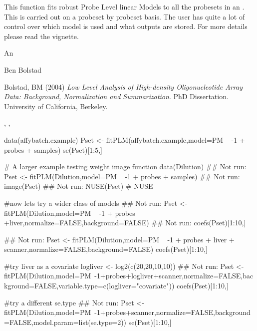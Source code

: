 \begin{Details}\relax
This function fits robust Probe Level linear Models to all the probesets in
an . This is carried out on a probeset by
probeset basis. The user has quite a lot of control over which model
is used and what outputs are stored. For more details please read the vignette.
\end{Details}
\begin{Value}
An 
\end{Value}
\begin{Author}\relax
Ben Bolstad 
\end{Author}
\begin{References}\relax
Bolstad, BM (2004) \emph{Low Level Analysis of High-density
Oligonucleotide Array Data: Background, Normalization and
Summarization}. PhD Dissertation. University of California,
Berkeley.
\end{References}
\begin{SeeAlso}\relax
{},
, 
\end{SeeAlso}
\begin{Examples}
\begin{ExampleCode}
data(affybatch.example)
Pset <- fitPLM(affybatch.example,model=PM ~ -1 + probes + samples)
se(Pset)[1:5,]

# A larger example testing weight image function
data(Dilution)
## Not run: Pset <- fitPLM(Dilution,model=PM ~ -1 + probes + samples)
## Not run: image(Pset)
## Not run: NUSE(Pset) # NUSE

#now lets try a wider class of models
## Not run: Pset <- fitPLM(Dilution,model=PM ~ -1 + probes +liver,normalize=FALSE,background=FALSE)
## Not run: coefs(Pset)[1:10,]

## Not run: Pset <- fitPLM(Dilution,model=PM ~ -1 + probes + liver + scanner,normalize=FALSE,background=FALSE)
coefs(Pset)[1:10,]

#try liver as a covariate
logliver <- log2(c(20,20,10,10))
## Not run: Pset <- fitPLM(Dilution,model=PM~-1+probes+logliver+scanner,normalize=FALSE,background=FALSE,variable.type=c(logliver="covariate"))
coefs(Pset)[1:10,]

#try a different se.type
## Not run: Pset <- fitPLM(Dilution,model=PM~-1+probes+scanner,normalize=FALSE,background=FALSE,model.param=list(se.type=2))
se(Pset)[1:10,]

\end{ExampleCode}
\end{Examples}

